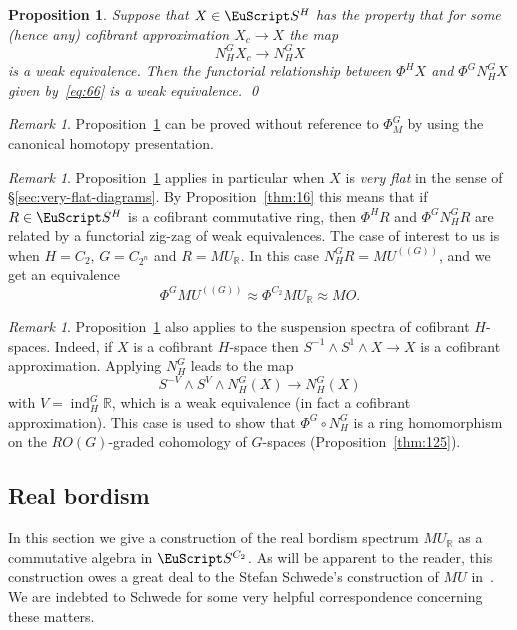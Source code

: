 \documentclass{amsart}
\newtheorem{prop}[equation]{Proposition}
\newtheorem{rem}[equation]{Remark}
\theoremstyle{definition}
\theoremstyle{remark}
\newtheorem{rem}[equation]{Remark}
\newcommand{\R}{{\mathbb R}}
\newcommand{\spectra}{\EuScript S}
\newcommand{\mur}{MU_{\R}}
\newcommand{\mutn}[1]{MU^{(\!(#1)\!)}}
\newcommand{\norm}{N}
\newcommand{\gfp}[1]{\Phi^{#1}}
\newcommand{\gfpm}[1]{\Phi_{M}^{#1}}
\newcommand{\phig}{\gfp{G}}
\newcommand{\phigm}{\gfpm{G}}
\newcommand{\phih}{\gfp{H}}
\DeclareMathOperator{\ind}{ind}
\newcommand{\ugspectra}[1]{\spectra^{#1}}
\newcommand{\zt}{C_{2}}
\newcommand{\ztn}{C_{2^{n}}}
\begin{document}
\begin{prop}
\label{thm:97}
Suppose that $X\in\ugspectra{H}$ has the property that for some (hence
any) cofibrant approximation $X_{c}\to X$ the map 
\[
\norm_{H}^{G}X_{c}\to \norm_{H}^{G}X
\]
is a weak equivalence.  Then the functorial relationship between
$\phih X$ and $\phig\norm_{H}^{G}X$ given by~\eqref{eq:66} is a weak
equivalence.  \qed
\end{prop}

\begin{rem}
\label{rem:68}
Proposition~\ref{thm:97} can be proved without reference to $\phigm$
by using the canonical homotopy presentation.
\end{rem}

\begin{rem}
\label{rem:33} Proposition~\ref{thm:97} applies in particular when $X$
is {\em very flat} in the sense of \S\ref{sec:very-flat-diagrams}.  By
Proposition~\ref{thm:16} this means that if $R\in\ugspectra{H}$ is a
cofibrant commutative ring, then $\phih R$ and $\phig\norm_{H}^{G}R$
are related by a functorial zig-zag of weak equivalences.  The case of
interest to us is when $H=\zt$, $G=\ztn$ and $R=\mur$.  In this case
$\norm_{H}^{G}R = \mutn{G}$, and we get an equivalence
\[
\phig\mutn{G}\approx \gfp{\zt}\mur \approx MO.
\]
\end{rem}

\begin{rem}
\label{rem:10}
Proposition~\ref{thm:97} also applies to the suspension spectra of
cofibrant $H$-spaces.  Indeed, if $X$ is a cofibrant $H$-space then
$S^{-1}\wedge S^{1}\wedge X\to X$ is a cofibrant approximation.
Applying $\norm_{H}^{G}$ leads to the map 
\[
S^{-V}\wedge S^{V}\wedge\norm_{H}^{G}(X) \to
\norm_{H}^{G}(X)
\]
with $V=\ind_{H}^{G}\R$, which is a weak equivalence (in fact a
cofibrant approximation).  This case is used to show that
$\phig\circ\norm_{H}^{G}$ is a ring homomorphism on the $RO(G)$-graded
cohomology of $G$-spaces (Proposition~\ref{thm:125}).
\end{rem}

\subsection{Real bordism}
\label{sec:real-bordism}
In this section we give a construction of the real bordism spectrum
$\mur$ as a commutative algebra in $\ugspectra{\zt}$.  As will be
apparent to the reader, this construction owes a great deal to the
Stefan Schwede's construction of $MU$ in~\cite[Chapter
2]{schwede:_untit_book_projec_about_symmet_spect}. We are indebted to
Schwede for some very helpful correspondence concerning these matters.
\end{document}
